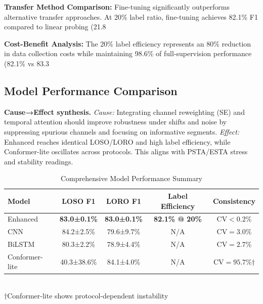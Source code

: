 \documentclass[journal]{IEEEtran}
\begin{document}
\textbf{Transfer Method Comparison:} Fine-tuning significantly outperforms alternative transfer approaches. At 20\% label ratio, fine-tuning achieves 82.1\% F1 compared to linear probing (21.8%

\textbf{Cost-Benefit Analysis:} The 20\% label efficiency represents an 80\% reduction in data collection costs while maintaining 98.6\% of full-supervision performance (82.1\% vs 83.3%

\subsection{Model Performance Comparison}

\textbf{Cause→Effect synthesis.} \emph{Cause:} Integrating channel reweighting (SE) and temporal attention should improve robustness under shifts and noise by suppressing spurious channels and focusing on informative segments. \emph{Effect:} Enhanced reaches identical LOSO/LORO and high label efficiency, while Conformer-lite oscillates across protocols. This aligns with PSTA/ESTA stress and stability readings.


\begin{table}[ht]
\centering
\caption{Comprehensive Model Performance Summary}
\begin{tabular}{@{}lcccc@{}}
\toprule
Model & LOSO F1 & LORO F1 & Label Efficiency & Consistency \\
\midrule
Enhanced & \textbf{83.0±0.1\%} & \textbf{83.0±0.1\%} & \textbf{82.1\% @ 20\%} & \textbf{$\text{CV}<0.2\%$} \\
CNN & 84.2±2.5\% & 79.6±9.7\% & N/A & $\text{CV}=3.0\%$ \\
BiLSTM & 80.3±2.2\% & 78.9±4.4\% & N/A & $\text{CV}=2.7\%$ \\
Conformer-lite & 40.3±38.6\% & 84.1±4.0\% & N/A & $\text{CV}=95.7\%$† \\
\bottomrule
\end{tabular}\\
\footnotesize{†Conformer-lite shows protocol-dependent instability}
\label{tab:model_performance}
\end{table}
\end{document}
